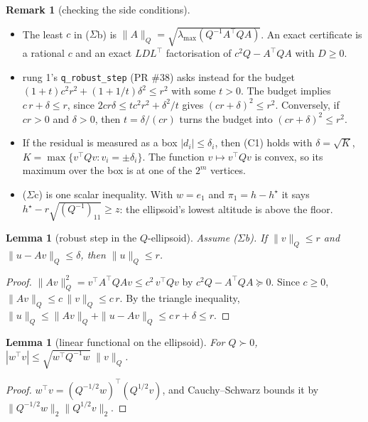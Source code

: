 \documentclass[11pt]{article}
\newtheorem{lemma}[theorem]{Lemma}
\theoremstyle{definition}
\newtheorem{remark}[theorem]{Remark}
\newcommand{\nQ}[1]{\|#1\|_Q}
\begin{document}
\begin{remark}[checking the side conditions]\label{rem:sigma}
\begin{itemize}
\item The least $c$ in ($\Sigma$b) is $\|A\|_Q = \sqrt{\lambda_{\max}(Q^{-1} A^\top Q A)}$. An exact certificate is a rational $c$ and an exact $LDL^\top$ factorisation of $c^2 Q - A^\top Q A$ with $D \ge 0$.
\item rung 1's \texttt{q\_robust\_step} (PR \#38) asks instead for the budget $(1+t)c^2 r^2 + (1 + 1/t)\delta^2 \le r^2$ with some $t > 0$. The budget implies $c\,r + \delta \le r$, since $2 c r \delta \le t c^2 r^2 + \delta^2/t$ gives $(c r + \delta)^2 \le r^2$. Conversely, if $c r > 0$ and $\delta > 0$, then $t = \delta/(c r)$ turns the budget into $(c r + \delta)^2 \le r^2$.
\item If the residual is measured as a box $|d_i| \le \delta_i$, then (C1) holds with $\delta = \sqrt{K}$, $K = \max\{v^\top Q v : v_i = \pm\delta_i\}$. The function $v \mapsto v^\top Q v$ is convex, so its maximum over the box is at one of the $2^m$ vertices.
\item ($\Sigma$c) is one scalar inequality. With $w = e_1$ and $\pi_1 = h - h^\star$ it says $h^\star - r\sqrt{(Q^{-1})_{11}} \ge z$: the ellipsoid's lowest altitude is above the floor.
\end{itemize}
\end{remark}

\begin{lemma}[robust step in the $Q$-ellipsoid]\label{lem:qstep}
Assume ($\Sigma$b). If $\nQ{v} \le r$ and $\nQ{u - A v} \le \delta$, then $\nQ{u} \le r$.
\end{lemma}
\begin{proof}
$\nQ{Av}^2 = v^\top A^\top Q A v \le c^2\, v^\top Q v$ by $c^2 Q - A^\top Q A \succeq 0$. Since $c \ge 0$, $\nQ{Av} \le c\,\nQ{v} \le c\,r$. By the triangle inequality, $\nQ{u} \le \nQ{Av} + \nQ{u - Av} \le c\,r + \delta \le r$.
\end{proof}

\begin{lemma}[linear functional on the ellipsoid]\label{lem:lin}
For $Q \succ 0$, $|w^\top v| \le \sqrt{w^\top Q^{-1} w}\;\nQ{v}$.
\end{lemma}
\begin{proof}
$w^\top v = (Q^{-1/2} w)^\top (Q^{1/2} v)$, and Cauchy--Schwarz bounds it by $\|Q^{-1/2} w\|_2 \|Q^{1/2} v\|_2$.
\end{proof}
\end{document}
